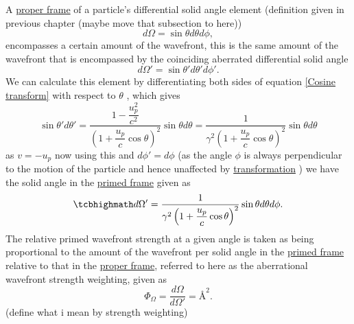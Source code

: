A \hyperlink{def-proper-frame}{proper frame} of a particle's differential solid angle element  (definition given in previous chapter (maybe move that subsection to here))
\begin{equation}%
    d\Omega = \sin{\theta} d\theta d\phi,
\end{equation}%
encompasses a certain amount of the wavefront, this is the same amount of the wavefront that is encompassed by the coinciding aberrated differential solid angle
\begin{equation}%
    d\Omega' = \sin{\theta'} d\theta' d\phi'.
\end{equation}%
We can calculate this element by differentiating both sides of equation \eqref{Cosine transform} with respect to $\theta$ \cite{hogg1997special}, which gives
\begin{equation}%
    \sin{\theta'} d\theta' =   \dfrac{1-\dfrac{u_p^2}{c^2}}{\left(1+\dfrac{u_p}{c}\cos{\theta}\right)^2} \sin{\theta} d\theta =  \dfrac{1}{\gamma^2\left(1+\dfrac{u_p}{c}\cos{\theta}\right)^2} \sin{\theta} d\theta
\end{equation}%
as $v=-u_p$ now using this and $d\phi'=d\phi$ (as the angle $\phi$ is always perpendicular to the motion of the particle and hence unaffected by \hyperlink{def-transform}{transformation} ) we have the solid angle in the \hyperlink{def-Primed-Frame}{primed frame} given as
\begin{equation}%
\mhl{
    d\Omega' = \dfrac{1}{\gamma^2\left(1+\dfrac{u_p}{c}\cos{\theta}\right)^2} \sin{\theta} d\theta d\phi.
    }
\end{equation}%
The relative primed wavefront strength at a given angle is taken as being proportional to the amount of the wavefront per solid angle in the \hyperlink{def-Primed-Frame}{primed frame} relative to that in the \hyperlink{def-proper-frame}{proper frame}, referred to here as the aberrational wavefront strength weighting, given as
\begin{equation}%
\label{eq: aberrational wavefront weighting}
    \Phi_\Omega = \frac{d\Omega}{d\Omega'} = \text{\AA}^2.
\end{equation}%
(define what i mean by strength weighting)

